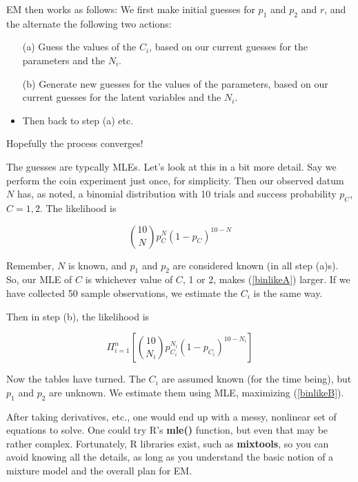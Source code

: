 EM then works as follows:  We first make initial guesses for $p_1$ and $p_2$
and $r$, and the alternate the following two actions:

\begin{itemize}

\item[(a)] Guess the values of the $C_i$, based on our current guesses for
the parameters and the $N_i$.

\item[(b)] Generate new guesses for the values of the parameters, based on
our current guesses for the latent variables and the $N_i$.

\item Then back to step (a) etc.

\end{itemize} 

Hopefully the process converges!

The guesses are typcally MLEs.  Let's look at this in a bit more detail.
Say we perform the coin experiment just once, for simplicity.  Then our
observed datum $N$ has, as noted, a binomial distribution with 10 trials
and success probability $p_C$, $C = 1,2$.  The likelihood is

\begin{equation}
\label{binlikeA}
\binom{10}{N} p_C^N (1-p_C)^{10-N}
\end{equation}

Remember, $N$ is known, and $p_1$ and $p_2$ are considered known (in all
step (a)s).  So, our MLE of $C$ is whichever value of $C$, 1 or 2, makes
(\ref{binlikeA}) larger.  If we have collected 50 sample observations, we
estimate the $C_i$ is the same way.

Then in step (b), the likelihood is

\begin{equation}
\label{binlikeB}
\Pi_{i=1}^n
\left [ \binom{10}{N_i} p_{C_i}^{N_i} (1-p_{C_i})^{10-N_i} 
\right ]
\end{equation}

Now the tables have turned.  The $C_i$ are assumed known (for the time
being), but $p_1$ and $p_2$ are unknown.  We estimate them using MLE,
maximizing (\ref{binlikeB}).

After taking derivatives, etc., one would end up with a messy, nonlinear
set of equations to solve.  One could try R's {\bf mle()} function, but
even that may be rather complex.  Fortunately, R libraries exist, such
as {\bf mixtools}, so you can avoid knowing all the details, as long as
you understand the basic notion of a mixture model and the overall plan
for EM.  

